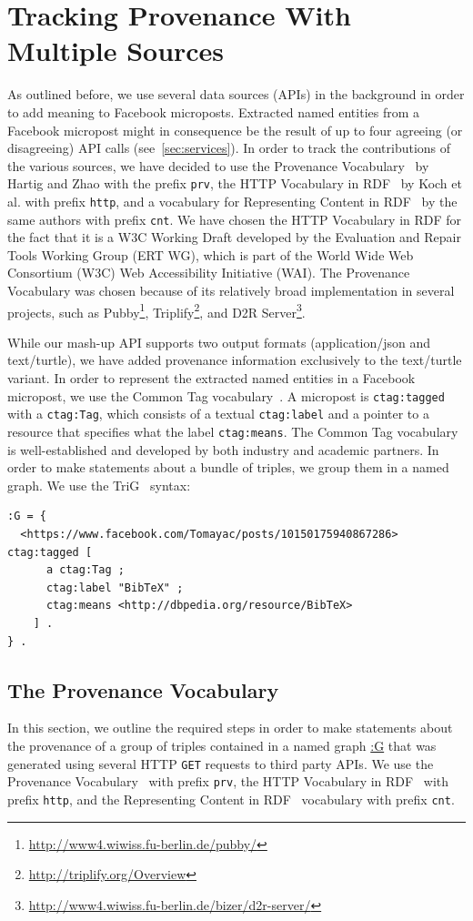 \documentclass[conference]{IEEEtran}
\begin{document}
\section{Tracking Provenance With Multiple Sources}                    \label{sec:tracking}
As outlined before, we use several data sources (APIs) in the background in order to add meaning to Facebook microposts. Extracted named entities from a Facebook micropost might in consequence be the result of up to four agreeing (or disagreeing) API calls (see~\autoref{sec:services}). In order to track the contributions of the various sources, we have decided to use the Provenance Vocabulary~\cite{Hartig:Provenance} by Hartig and Zhao with the prefix \texttt{prv}, the HTTP Vocabulary in RDF~\cite{HTTP:RDF} by Koch et al. with prefix \texttt{http}, and a vocabulary for Representing Content in RDF~\cite{CNT:RDF} by the same authors with prefix \texttt{cnt}. We have chosen the HTTP Vocabulary in RDF for the fact that it is a W3C Working Draft  developed by the Evaluation and Repair Tools Working Group (ERT WG), which is part of the World Wide Web Consortium (W3C) Web Accessibility Initiative (WAI). The Provenance Vocabulary was chosen because of its relatively broad implementation in several projects, such as Pubby\footnote{\url{http://www4.wiwiss.fu-berlin.de/pubby/}}, Triplify\footnote{\url{http://triplify.org/Overview}}, and D2R Server\footnote{\url{http://www4.wiwiss.fu-berlin.de/bizer/d2r-server/}}.

While our mash-up API supports two output formats (application/json and text/turtle), we have added provenance information exclusively to the text/turtle variant. In order to represent the extracted named entities in a Facebook micropost, we use the Common Tag vocabulary~\cite{CommonTag:Spec}. A micropost is \texttt{ctag:tagged} with a \texttt{ctag:Tag}, which consists of a textual \texttt{ctag:label} and a pointer to a resource that specifies what the label \texttt{ctag:means}. The Common Tag vocabulary is well-established and developed by both industry and academic partners. In order to make statements about a bundle of triples, we group them in a named graph. We use the TriG~\cite{Bizer:TriG} syntax:
\begin{lstlisting}
:G = {
  <https://www.facebook.com/Tomayac/posts/10150175940867286> ctag:tagged [
      a ctag:Tag ;
      ctag:label "BibTeX" ;
      ctag:means <http://dbpedia.org/resource/BibTeX>
    ] .
} .
\end{lstlisting}

\subsection{The Provenance Vocabulary}                                      \label{sec:provenance}
In this section, we outline the required steps in order to make statements about the provenance of a group of triples contained in a named graph \url{:G} that was generated using several HTTP \texttt{GET} requests to third party APIs. We use the Provenance Vocabulary~\cite{Hartig:Provenance} with prefix \texttt{prv}, the HTTP Vocabulary in RDF~\cite{HTTP:RDF} with prefix \texttt{http}, and the Representing Content in RDF~\cite{CNT:RDF} vocabulary with prefix \texttt{cnt}.
\end{document}
